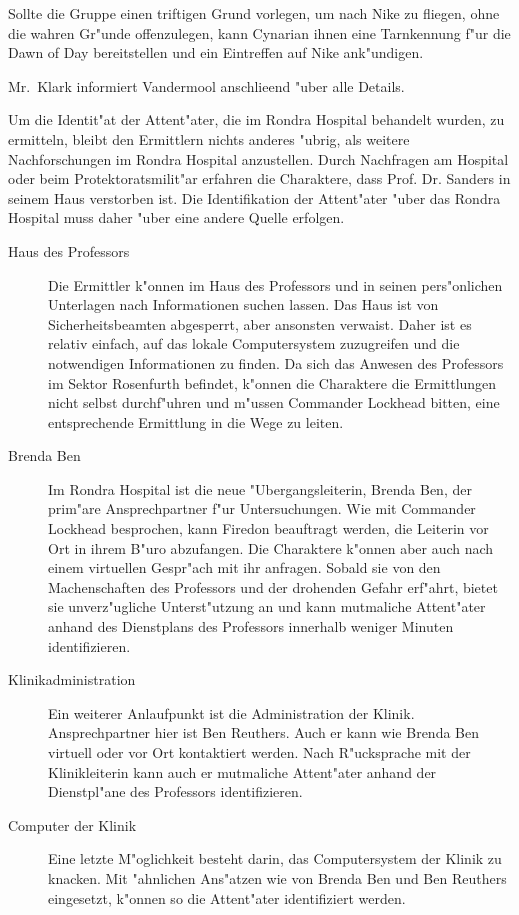 Sollte die Gruppe einen triftigen Grund vorlegen, um nach Nike zu fliegen, ohne die wahren Gr"unde offenzulegen, kann Cynarian ihnen eine Tarnkennung f"ur die Dawn of Day bereitstellen und ein Eintreffen auf Nike ank"undigen.

Mr.~Klark informiert Vandermool anschlie\3end "uber alle Details.


Um die Identit"at der Attent"ater, die im Rondra Hospital behandelt wurden, zu ermitteln, bleibt den Ermittlern nichts anderes "ubrig, als weitere Nachforschungen im Rondra Hospital anzustellen. Durch Nachfragen am Hospital oder beim Protektoratsmilit"ar erfahren die Charaktere, dass Prof. Dr. Sanders in seinem Haus verstorben ist. Die Identifikation der Attent"ater "uber das Rondra Hospital muss daher "uber eine andere Quelle erfolgen.

\begin{description}
	\item[Haus des Professors] Die Ermittler k"onnen im Haus des Professors und in seinen pers"onlichen Unterlagen nach Informationen suchen 
		lassen. Das Haus ist von Sicherheitsbeamten abgesperrt, aber ansonsten verwaist. Daher ist es relativ einfach, auf das lokale Computersystem zuzugreifen und die notwendigen Informationen zu finden. Da sich das Anwesen des Professors im Sektor Rosenfurth befindet, k"onnen die Charaktere die Ermittlungen nicht selbst durchf"uhren und m"ussen Commander Lockhead bitten, eine entsprechende Ermittlung in die Wege zu leiten.
	\item[Brenda Ben] Im Rondra Hospital ist die neue "Ubergangsleiterin, Brenda Ben, der prim"are Ansprechpartner f"ur Untersuchungen. Wie 
		mit Commander Lockhead besprochen, kann Firedon beauftragt werden, die Leiterin vor Ort in ihrem B"uro abzufangen. Die Charaktere k"onnen aber auch nach einem virtuellen Gespr"ach mit ihr anfragen. Sobald sie von den Machenschaften des Professors und der drohenden Gefahr erf"ahrt, bietet sie unverz"ugliche Unterst"utzung an und kann mutma\3liche Attent"ater anhand des Dienstplans des Professors innerhalb weniger Minuten identifizieren.
	\item[Klinikadministration] Ein weiterer Anlaufpunkt ist die Administration der Klinik. Ansprechpartner hier ist Ben Reuthers. Auch er 
		kann wie Brenda Ben virtuell oder vor Ort kontaktiert werden. Nach R"ucksprache mit der Klinikleiterin kann auch er mutma\3liche Attent"ater anhand der Dienstpl"ane des Professors identifizieren.
	\item[Computer der Klinik] Eine letzte M"oglichkeit besteht darin, das Computersystem der Klinik zu knacken. Mit "ahnlichen Ans"atzen wie 
		von Brenda Ben und Ben Reuthers eingesetzt, k"onnen so die Attent"ater identifiziert werden.
\end{description}

